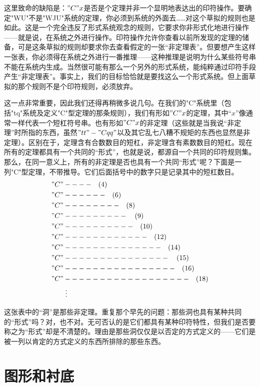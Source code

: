 这里致命的缺陷是：$"C"x$是否是个定理并非一个显明地表达出的印符操作。要确定"WU"不是"WJU"系统的定理，你必须到系统的外面去……对这个草拟的规则也是如此。这是一个完全违反了形式系统观念的规则，它要求你非形式化地进行操作——就是说，在系统之外进行操作。印符操作允许你查看以前所发现的定理的储备，可是这条草拟的规则却要求你去查看假定的一张“非定理表”。但要想产生这样一张表，你必须得在系统之外进行一番推理——这种推理是说明为什么某些符号串不能在系统内生成。当然很可能有那么一个另外的形式系统，能纯粹通过印符手段产生“非定理表”。事实上，我们的目标恰恰就是要找这么一个形式系统。但上面草拟的那个规则不是个印符规则，必须放弃。

这一点非常重要，因此我们还得再稍微多说几句。在我们的"C"系统里（包括"tq"系统及定义"C"型定理的那条规则），我们有形如$"C"x$的定理，其中“$x$”像通常一样代表一个短杠符号串。也有形如$"C"x$的非定理（这些就是当我说“非定理”时所指的东西，虽然$"tt"-"Cqq"$以及其它乱七八糟不规矩的东西也显然是非定理）。区别在于，定理含有合数数目的短杠，非定理含有素数数目的短杠。现在所有的定理都具有一个共同的“形式”，也就是说，都源自一个共同的印符规则集。那么，在同一意义上，所有的非定理是否也具有一个共同“形式”呢？下面是一列"C"型定理，不带推导。它们后面括号中的数字只是记录其中的短杠数目。
\begin{align*}
 & "C"---- \quad (4) \\
 & "C"------ \quad (6) \\
 & "C"-------- \quad (8) \\
 & "C"--------- \quad (9) \\
 & "C"---------- \quad (10) \\
 & "C"------------ \quad (12) \\
 & "C"-------------- \quad (14) \\
 & "C"--------------- \quad (15) \\
 & "C"---------------- \quad (16) \\
 & "C"------------------ \quad (18) \\
 & \qquad \vdots
\end{align*}

这张表中的“洞”是那些非定理。重复那个早先的问题：那些洞也具有某种共同的“形式”吗？对，也不对。无可否认的是它们都具有某种印符特性，但我们是否要称之为“形式”却是不清楚的。理由是那些洞仅仅是以否定的方式定义的——它们是被一列以肯定的方式定义的东西所排除的那些东西。

\section{图形和衬底}


